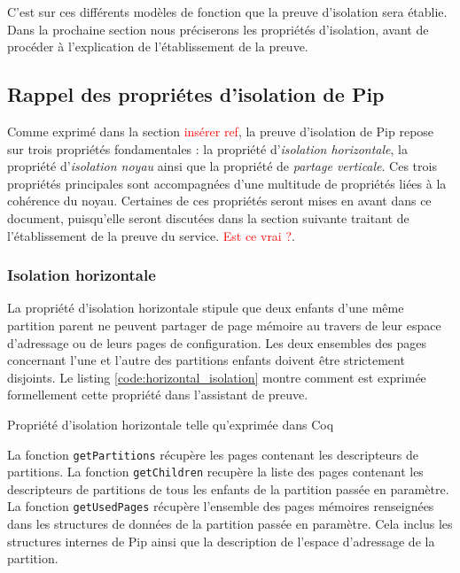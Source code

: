 		C'est sur ces différents modèles de fonction que la preuve d'isolation sera établie. Dans la prochaine section nous préciserons les propriétés d'isolation, avant de procéder à l'explication de l'établissement de la preuve.

		\subsection{Rappel des propriétes d'isolation de Pip}

		Comme exprimé dans la section \textcolor{red}{insérer ref}, la preuve d'isolation de Pip repose sur trois propriétés fondamentales : la propriété d'\emph{isolation horizontale}, la propriété d'\emph{isolation noyau} ainsi que la propriété de \emph{partage verticale}. Ces trois propriétés principales sont accompagnées d'une multitude de propriétés liées à la cohérence du noyau. Certaines de ces propriétés seront mises en avant dans ce document, puisqu'elle seront discutées dans la section suivante traitant de l'établissement de la preuve du service. \textcolor{red}{Est ce vrai ?}.

			\subsubsection{Isolation horizontale}

			La propriété d'isolation horizontale stipule que deux enfants d'une même partition parent ne peuvent partager de page mémoire au travers de leur espace d'adressage ou de leurs pages de configuration. Les deux ensembles des pages concernant l'une et l'autre des partitions enfants doivent être strictement disjoints. Le listing \ref{code:horizontal_isolation} montre comment est exprimée formellement cette propriété dans l'assistant de preuve.

			\begin{listing}[!ht]
				\caption{Propriété d'isolation horizontale telle qu'exprimée dans Coq}
				\label{code:horizontal_isolation}
			\end{listing}

			La fonction \texttt{getPartitions} récupère les pages contenant les descripteurs de partitions. La fonction \texttt{getChildren} recupère la liste des pages contenant les descripteurs de partitions de tous les enfants de la partition passée en paramètre. La fonction \texttt{getUsedPages} récupère l'ensemble des pages mémoires renseignées dans les structures de données de la partition passée en paramètre. Cela inclus les structures internes de Pip ainsi que la description de l'espace d'adressage de la partition.


